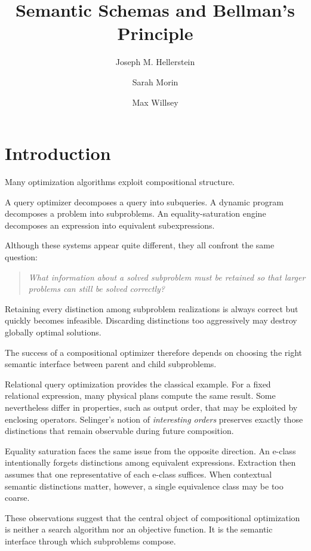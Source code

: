 \documentclass[sigconf,nonacm]{acmart}
\title{Semantic Schemas and Bellman's Principle}
\author{Joseph M. Hellerstein}
\affiliation{%
  \institution{UC Berkeley \& Amazon Web Services}
  \city{Berkeley, CA}
  \country{USA}
}
\author{Sarah Morin}
\affiliation{%
  \institution{UC Berkeley}
  \city{Berkeley, CA}
  \country{USA}
}
\author{Max Willsey}
\affiliation{%
  \institution{UC Berkeley}
  \city{Berkeley, CA}
  \country{USA}
}
\theoremstyle{definition}
\theoremstyle{plain}
\theoremstyle{remark}
\begin{document}
\maketitle

\section{Introduction}
\label{sec:introduction}

Many optimization algorithms exploit compositional structure.

A query optimizer decomposes a query into subqueries.
A dynamic program decomposes a problem into subproblems.
An equality-saturation engine decomposes an expression into equivalent
subexpressions.

Although these systems appear quite different, they all confront the
same question:

\begin{quote}
\emph{What information about a solved subproblem must be retained so
that larger problems can still be solved correctly?}
\end{quote}

Retaining every distinction among subproblem realizations is always
correct but quickly becomes infeasible.
Discarding distinctions too aggressively may destroy globally optimal
solutions.

The success of a compositional optimizer therefore depends on choosing
the right semantic interface between parent and child subproblems.

Relational query optimization provides the classical example.
For a fixed relational expression, many physical plans compute the same
result.
Some nevertheless differ in properties, such as output order, that may
be exploited by enclosing operators.
Selinger's notion of \emph{interesting orders} preserves exactly those
distinctions that remain observable during future composition.

Equality saturation faces the same issue from the opposite direction.
An e-class intentionally forgets distinctions among equivalent
expressions.
Extraction then assumes that one representative of each e-class
suffices.
When contextual semantic distinctions matter, however, a single
equivalence class may be too coarse.

These observations suggest that the central object of compositional
optimization is neither a search algorithm nor an objective function.
It is the semantic interface through which subproblems compose.
\end{document}
